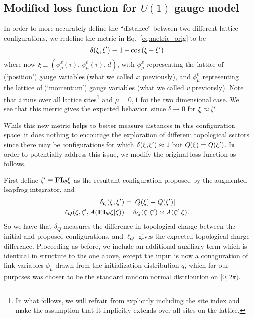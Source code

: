 \documentclass[../main.tex]{subfiles}
\begin{document}
\subsection{Modified loss function for \texorpdfstring{$U(1)$}{U (1)} gauge model}
\label{subsec:l2hmc_modifiedloss}
%
In order to more accurately define the ``distance'' between two different lattice configurations, we redefine the
metric in Eq.~\ref{eq:metric_orig} to be
%
\begin{equation}
  \delta(\xi, {\xi^{\prime}}) \equiv 1 - \cos\left(\xi - \xi^{\prime}\right)
  \label{eq:metric_new}
\end{equation}
%
where now $\xi \equiv {\left(\phi_{\mu}^{x}(i), \,\phi_{\mu}^{v}(i),\, d\right)}$, with $\phi_{\mu}^{x}$ representing
the lattice of (`position') gauge variables (what we called $x$ previously), and $\phi_{\mu}^{v}$ representing the
lattice of (`momentum') gauge variables (what we called $v$ previously). Note that $i$ runs over all lattice
sites\footnote{In what follows, we will refrain from explicitly including the site index and make the assumption that
it implicitly extends over all sites on the lattice.} and  $\mu=0, 1$ for the two dimensional case.
%
We see that this metric gives the expected behavior, since $\delta \rightarrow 0$ for $\xi \approx {\xi^{\prime}}$.

While this new metric helps to better measure distances in this configuration space, it does nothing to encourage the
exploration of different topological sectors since there may be configurations for which $\delta(\xi, {\xi^{\prime}}) \approx 1$
but $Q(\xi) = Q({\xi^{\prime}})$.
%
In order to potentially address this issue, we modify the original loss function as follows.


First define ${\xi^{\prime}}\equiv {\mathbf{FL}_{\theta}} \xi$ as the resultant configuration proposed by the augmented leapfrog integrator, and
%
\begin{align}
  \delta_{Q}{(\xi, \xi^{\prime})} &= \left|Q{(\xi)} - Q{(\xi^{\prime})}\right| \\
  \ell_{Q}{\left(\xi, {\xi^{\prime}}, A{({\mathbf{FL}_{\theta}}\xi|\xi)}\right)} &= \delta_{Q}{(\xi,{\xi^{\prime}})}
    \times A{({\xi^{\prime}}|\xi)}.
\end{align}
%
So we have that $\delta_{Q}$ measures the difference in topological charge between the initial and proposed
configurations, and $\ell_{Q}$ gives the expected topological charge difference.
%
Proceeding as before, we include an additional auxiliary term which is identical in structure to the one above, except
the input is now a configuration of link variables $\phi_{\mu}$ drawn from the initialization distribution $q$, which
for our purposes was chosen to be the standard random normal distribution on $[0, 2\pi)$. %
\end{document}
